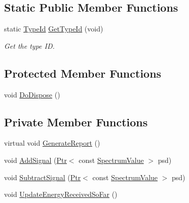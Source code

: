 \subsection*{Static Public Member Functions}
\begin{DoxyCompactItemize}
\item 
static \hyperlink{classns3_1_1TypeId}{Type\+Id} \hyperlink{classns3_1_1SpectrumAnalyzer_a7e5593739372939a2ac575d15f56ff3d}{Get\+Type\+Id} (void)
\begin{DoxyCompactList}\small\item\em Get the type ID. \end{DoxyCompactList}\end{DoxyCompactItemize}
\subsection*{Protected Member Functions}
\begin{DoxyCompactItemize}
\item 
void \hyperlink{classns3_1_1SpectrumAnalyzer_a1337283c92272f2480a7acd48d39ddde}{Do\+Dispose} ()
\end{DoxyCompactItemize}
\subsection*{Private Member Functions}
\begin{DoxyCompactItemize}
\item 
virtual void \hyperlink{classns3_1_1SpectrumAnalyzer_a77ec2c9171d4074ab310bc2924e6450b}{Generate\+Report} ()
\item 
void \hyperlink{classns3_1_1SpectrumAnalyzer_a859fb7eda08638f05fc4fe9aecf8dae0}{Add\+Signal} (\hyperlink{classns3_1_1Ptr}{Ptr}$<$ const \hyperlink{classns3_1_1SpectrumValue}{Spectrum\+Value} $>$ psd)
\item 
void \hyperlink{classns3_1_1SpectrumAnalyzer_ae1a38637f702b000b69acd042e94c89a}{Subtract\+Signal} (\hyperlink{classns3_1_1Ptr}{Ptr}$<$ const \hyperlink{classns3_1_1SpectrumValue}{Spectrum\+Value} $>$ psd)
\item 
void \hyperlink{classns3_1_1SpectrumAnalyzer_ad43ce99d945b956dfffe410fd87c1a9e}{Update\+Energy\+Received\+So\+Far} ()
\end{DoxyCompactItemize}
